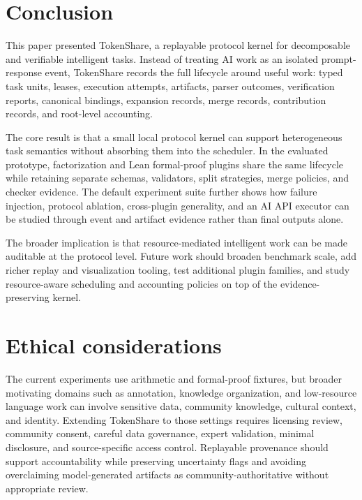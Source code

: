 \documentclass{article}
\theoremstyle{plain}
\begin{document}
\section{Conclusion}

{\color{blue}
This paper presented TokenShare, a replayable protocol kernel for decomposable and verifiable intelligent tasks. Instead of treating AI work as an isolated prompt-response event, TokenShare records the full lifecycle around useful work: typed task units, leases, execution attempts, artifacts, parser outcomes, verification reports, canonical bindings, expansion records, merge records, contribution records, and root-level accounting.

The core result is that a small local protocol kernel can support heterogeneous task semantics without absorbing them into the scheduler. In the evaluated prototype, factorization and Lean formal-proof plugins share the same lifecycle while retaining separate schemas, validators, split strategies, merge policies, and checker evidence. The default experiment suite further shows how failure injection, protocol ablation, cross-plugin generality, and an AI API executor can be studied through event and artifact evidence rather than final outputs alone.

The broader implication is that resource-mediated intelligent work can be made auditable at the protocol level. Future work should broaden benchmark scale, add richer replay and visualization tooling, test additional plugin families, and study resource-aware scheduling and accounting policies on top of the evidence-preserving kernel.
}


\section*{Ethical considerations}

{\color{blue}
The current experiments use arithmetic and formal-proof fixtures, but broader motivating domains such as annotation, knowledge organization, and low-resource language work can involve sensitive data, community knowledge, cultural context, and identity. Extending TokenShare to those settings requires licensing review, community consent, careful data governance, expert validation, minimal disclosure, and source-specific access control. Replayable provenance should support accountability while preserving uncertainty flags and avoiding overclaiming model-generated artifacts as community-authoritative without appropriate review.
}





\end{document}
